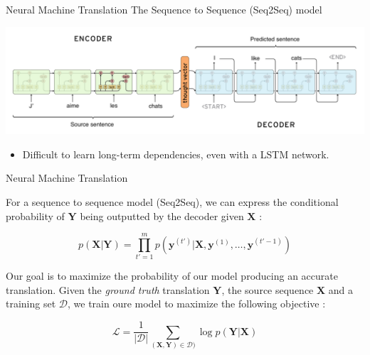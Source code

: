 \documentclass[aspectratio=169]{beamer}
\begin{document}
\begin{frame}{Neural Machine Translation}
The Sequence to Sequence (Seq2Seq) model \cite{cho2014learning, sutskever2014sequence}

\includegraphics[width=\textwidth]{figures/seq2seq}

\begin{itemize}
	\item Difficult to learn long-term dependencies, even with a LSTM network.
\end{itemize}

\end{frame}

\begin{frame}{Neural Machine Translation}

For a sequence to sequence model (Seq2Seq), we can express the conditional probability of $\mathbf{Y}$ being outputted by the decoder given $\mathbf{X}$ :

$$
p(\mathbf{X}|\mathbf{Y}) = \prod _{t'=1}^{m} p(\mathbf{y}^{(t')}|\mathbf{X}, \mathbf{y}^{(1)}, \dots, \mathbf{y}^{(t'-1)})
$$

Our goal is to maximize the probability of our model producing an accurate translation. Given the \textit{ground truth} translation $\mathbf{Y}$, the source sequence $\mathbf{X}$ and a training set $\mathcal{D}$, we train oure model to maximize the following objective :

$$
\mathcal{L} = \frac{1}{|\mathcal{D}|} \sum _{(\mathbf{X}, \mathbf{Y}) \in \mathcal{D})} \log p(\mathbf{Y}|\mathbf{X})
$$

\end{frame}
\end{document}
